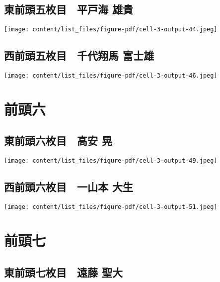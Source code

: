 \documentclass[
  letterpaper,
]{bxjsbook}
\begin{document}
\subsection{東前頭五枚目　平戸海
雄貴}\label{ux6771ux524dux982dux4e94ux679aux76ee-ux5e73ux6238ux6d77-ux96c4ux8cb4}

\texttt{[image: content/list\_files/figure-pdf/cell-3-output-44.jpeg]}

\subsection{西前頭五枚目　千代翔馬
富士雄}\label{ux897fux524dux982dux4e94ux679aux76ee-ux5343ux4ee3ux7fd4ux99ac-ux5bccux58ebux96c4}

\texttt{[image: content/list\_files/figure-pdf/cell-3-output-46.jpeg]}

\section{前頭六}\label{ux524dux982dux516d}

\subsection{東前頭六枚目　高安
晃}\label{ux6771ux524dux982dux516dux679aux76ee-ux9ad8ux5b89-ux6643}

\texttt{[image: content/list\_files/figure-pdf/cell-3-output-49.jpeg]}

\subsection{西前頭六枚目　一山本
大生}\label{ux897fux524dux982dux516dux679aux76ee-ux4e00ux5c71ux672c-ux5927ux751f}

\texttt{[image: content/list\_files/figure-pdf/cell-3-output-51.jpeg]}

\section{前頭七}\label{ux524dux982dux4e03}

\subsection{東前頭七枚目　遠藤
聖大}\label{ux6771ux524dux982dux4e03ux679aux76ee-ux9060ux85e4-ux8056ux5927}
\end{document}
